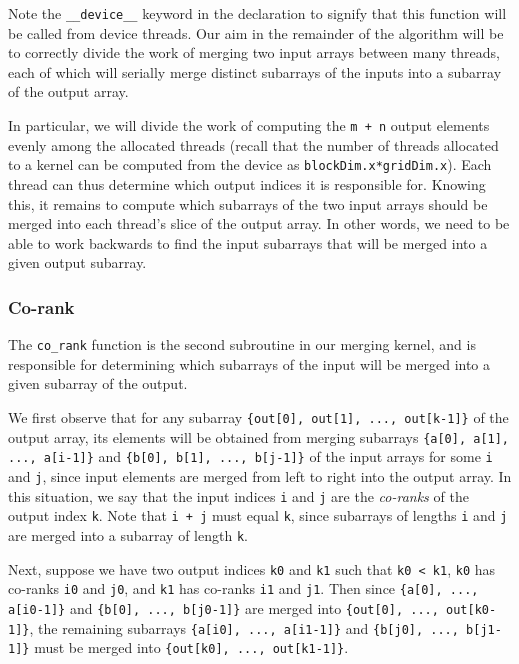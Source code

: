 \documentclass{article}
\theoremstyle{definition}
\begin{document}
Note the \texttt{\_\_device\_\_} keyword in the declaration to signify that this function will be called from device threads. Our aim in the remainder of the algorithm will be to correctly divide the work of merging two input arrays between many threads, each of which will serially merge distinct subarrays of the inputs into a subarray of the output array.

In particular, we will divide the work of computing the \texttt{m + n} output elements evenly among the allocated threads (recall that the number of threads allocated to a kernel can be computed from the device as \texttt{blockDim.x*gridDim.x}). Each thread can thus determine which output indices it is responsible for. Knowing this, it remains to compute which subarrays of the two input arrays should be merged into each thread's slice of the output array. In other words, we need to be able to work backwards to find the input subarrays that will be merged into a given output subarray.

\subsubsection{Co-rank}

The \texttt{co\_rank} function is the second subroutine in our merging kernel, and is responsible for determining which subarrays of the input will be merged into a given subarray of the output. 

We first observe that for any subarray \texttt{\{out[0], out[1], ..., out[k-1]\}} of the output array, its elements will be obtained from merging subarrays \texttt{\{a[0], a[1], ..., a[i-1]\}} and \texttt{\{b[0], b[1], ..., b[j-1]\}} of the input arrays for some \texttt{i} and \texttt{j}, since input elements are merged from left to right into the output array. In this situation, we say that the input indices \texttt{i} and \texttt{j} are the \emph{co-ranks} of the output index \texttt{k}. Note that \texttt{i + j} must equal \texttt{k}, since subarrays of lengths \texttt{i} and \texttt{j} are merged into a subarray of length \texttt{k}.

Next, suppose we have two output indices \texttt{k0} and \texttt{k1} such that \texttt{k0 < k1}, \texttt{k0} has co-ranks \texttt{i0} and \texttt{j0}, and \texttt{k1} has co-ranks \texttt{i1} and \texttt{j1}. Then since \texttt{\{a[0], ..., a[i0-1]\}} and \texttt{\{b[0], ..., b[j0-1]\}} are merged into \texttt{\{out[0], ..., out[k0-1]\}}, the remaining subarrays \texttt{\{a[i0], ..., a[i1-1]\}} and \texttt{\{b[j0], ..., b[j1-1]\}} must be merged into \texttt{\{out[k0], ..., out[k1-1]\}}.
\end{document}
